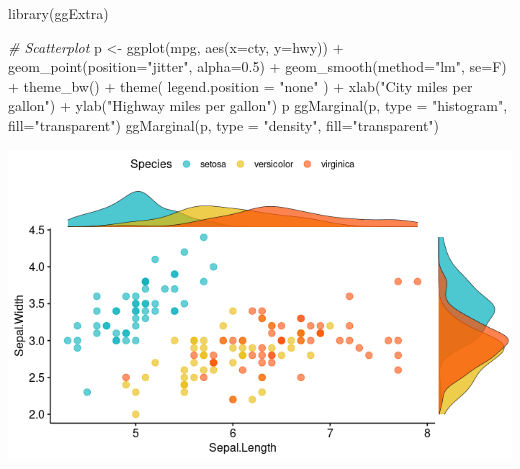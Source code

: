 \documentclass[
]{book}
\newenvironment{Shaded}{\begin{snugshade}}{\end{snugshade}}
\newcommand{\AttributeTok}[1]{\textcolor[rgb]{0.77,0.63,0.00}{#1}}
\newcommand{\CommentTok}[1]{\textcolor[rgb]{0.56,0.35,0.01}{\textit{#1}}}
\newcommand{\FloatTok}[1]{\textcolor[rgb]{0.00,0.00,0.81}{#1}}
\newcommand{\FunctionTok}[1]{\textcolor[rgb]{0.00,0.00,0.00}{#1}}
\newcommand{\NormalTok}[1]{#1}
\newcommand{\OtherTok}[1]{\textcolor[rgb]{0.56,0.35,0.01}{#1}}
\newcommand{\SpecialCharTok}[1]{\textcolor[rgb]{0.00,0.00,0.00}{#1}}
\newcommand{\StringTok}[1]{\textcolor[rgb]{0.31,0.60,0.02}{#1}}
\begin{document}
\begin{Shaded}
\begin{Highlighting}[]
\FunctionTok{library}\NormalTok{(ggExtra)}

\CommentTok{\# Scatterplot}
\NormalTok{p }\OtherTok{\textless{}{-}} \FunctionTok{ggplot}\NormalTok{(mpg, }\FunctionTok{aes}\NormalTok{(}\AttributeTok{x=}\NormalTok{cty, }\AttributeTok{y=}\NormalTok{hwy)) }\SpecialCharTok{+} 
  \FunctionTok{geom\_point}\NormalTok{(}\AttributeTok{position=}\StringTok{"jitter"}\NormalTok{, }\AttributeTok{alpha=}\FloatTok{0.5}\NormalTok{) }\SpecialCharTok{+}
  \FunctionTok{geom\_smooth}\NormalTok{(}\AttributeTok{method=}\StringTok{"lm"}\NormalTok{, }\AttributeTok{se=}\NormalTok{F) }\SpecialCharTok{+}
  \FunctionTok{theme\_bw}\NormalTok{() }\SpecialCharTok{+}
  \FunctionTok{theme}\NormalTok{(}
    \AttributeTok{legend.position =} \StringTok{"none"}
\NormalTok{  ) }\SpecialCharTok{+}
  \FunctionTok{xlab}\NormalTok{(}\StringTok{"City miles per gallon"}\NormalTok{) }\SpecialCharTok{+}
  \FunctionTok{ylab}\NormalTok{(}\StringTok{"Highway miles per gallon"}\NormalTok{)}
\NormalTok{p}
\FunctionTok{ggMarginal}\NormalTok{(p, }\AttributeTok{type =} \StringTok{"histogram"}\NormalTok{, }\AttributeTok{fill=}\StringTok{"transparent"}\NormalTok{) }
\FunctionTok{ggMarginal}\NormalTok{(p, }\AttributeTok{type =} \StringTok{"density"}\NormalTok{, }\AttributeTok{fill=}\StringTok{"transparent"}\NormalTok{)}
\end{Highlighting}
\end{Shaded}

\includegraphics{images/10/000005.png}
\end{document}
